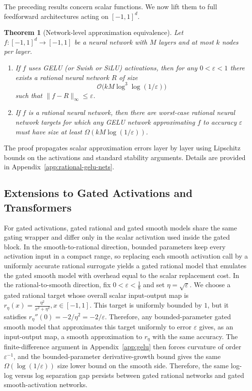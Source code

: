 \documentclass{article}
\theoremstyle{plain}
\newtheorem{theorem}{Theorem}[section]
\theoremstyle{definition}
\theoremstyle{remark}
\begin{document}
The preceding results concern scalar functions.  
We now lift them to full feedforward architectures acting on $[-1,1]^d$.

\begin{theorem}[Network-level approximation equivalence]
\label{thm:network_equivalence}
Let $f:[-1,1]^d\to[-1,1]$ be a neural network with $M$ layers and at most $k$ nodes per layer.

\begin{enumerate}
\item If $f$ uses GELU (or Swish or SiLU) activations, then for any $0<\varepsilon<1$ there exists a rational neural network $R$ of size
\[
\mathcal{O}\bigl(kM\log^3\log(1/\varepsilon)\bigr)
\]
such that $\|f-R\|_\infty\le \varepsilon$.

\item  {If $f$ is a rational neural network, then there are worst-case rational neural network targets for which any GELU network approximating $f$ to accuracy $\varepsilon$ must have size at least $\Omega(kM\log(1/\varepsilon))$.}
\end{enumerate}
\end{theorem}

The proof propagates scalar approximation errors layer by layer using Lipschitz bounds on the activations and standard stability arguments.  
Details are provided in Appendix~\ref{app:rational-gelu-nets}.


\subsection{Extensions to Gated Activations and Transformers}
\label{subsec:gated_transformers}


 {For gated activations, gated rational and gated smooth models share the same gating wrapper and differ only in the scalar activation used inside the gated block. In the smooth-to-rational direction, bounded parameters keep every activation input in a compact range, so replacing each smooth activation call by a uniformly accurate rational surrogate yields a gated rational model that emulates the gated smooth model with overhead equal to the scalar replacement cost. In the rational-to-smooth direction, fix $0<\varepsilon<\tfrac18$ and set $\eta=\sqrt{\varepsilon}$. We choose a gated rational target whose overall scalar input-output map is
\(
r_\eta(x)=\frac{\eta^2}{x^2+\eta^2}, x\in[-1,1].
\)
This target is uniformly bounded by $1$, but it satisfies $r_\eta''(0)=-2/\eta^2=-2/\varepsilon$. Therefore, any bounded-parameter gated smooth model that approximates this target uniformly to error $\varepsilon$ gives, as an input-output map, a smooth approximation to $r_\eta$ with the same accuracy. The finite-difference argument in Appendix~\ref{app:gelu} then forces curvature of order $\varepsilon^{-1}$, and the bounded-parameter derivative-growth bound gives the same $\Omega(\log(1/\varepsilon))$ size lower bound on the smooth side. Therefore, the same log-log versus log separation gap persists between gated rational networks and gated smooth-activation networks.}
\end{document}
